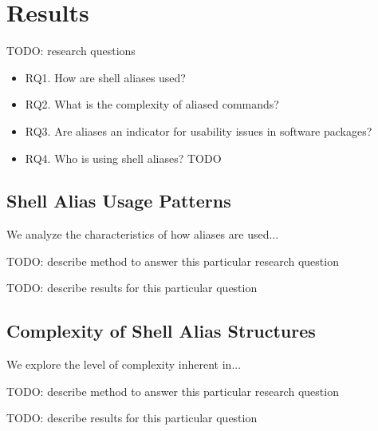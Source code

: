 \section{Results}

TODO: research questions

\begin{itemize}
	\item RQ1. How are shell aliases used?
	\item RQ2. What is the complexity of aliased commands? %
	\item RQ3. Are aliases an indicator for usability issues in software packages? %
	\item RQ4. Who is using shell aliases? TODO
\end{itemize}

\subsection{Shell Alias Usage Patterns}

We analyze the characteristics of how aliases are used...

TODO: describe method to answer this particular research question

TODO: describe results for this particular question

\subsection{Complexity of Shell Alias Structures}

We explore the level of complexity inherent in...

TODO: describe method to answer this particular research question

TODO: describe results for this particular question

